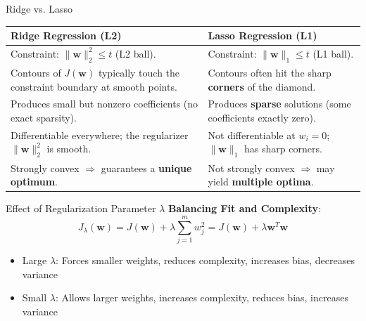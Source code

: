 \documentclass[serif, aspectratio=169]{beamer}
\begin{document}
\begin{frame}{Ridge vs. Lasso}
    \begin{table}[h!]
        \centering
        \renewcommand{\arraystretch}{1.4}
        \setlength{\tabcolsep}{8pt}
        \begin{tabular}{|p{}|p{}|}
            \hline
            \textbf{Ridge Regression (L2)} & \textbf{Lasso Regression (L1)} \\
            \hline
            Constraint: $\|\mathbf{w}\|_2^2 \le t$ (L2 ball). &
            Constraint: $\|\mathbf{w} \|_1 \le t$ (L1 ball). \\
            \hline
            Contours of $J(\mathbf{w})$ typically touch the constraint boundary at smooth points. &
            Contours often hit the sharp \textbf{corners} of the diamond. \\
            \hline
            Produces small but nonzero coefficients (no exact sparsity). &
            Produces \textbf{sparse} solutions (some coefficients exactly zero). \\
            \hline
            Differentiable everywhere; the regularizer $\|\mathbf{w}\|_2^2$ is smooth. &
            Not differentiable at $w_i = 0$; $\|\mathbf{w}\|_1$ has sharp corners. \\
            \hline
            Strongly convex $\Rightarrow$ guarantees a \textbf{unique optimum}. &
            Not strongly convex $\Rightarrow$ may yield \textbf{multiple optima}. \\
            \hline
        \end{tabular}
    \end{table}
\end{frame}



\begin{frame}{Effect of Regularization Parameter \( \lambda \)}
    \textbf{Balancing Fit and Complexity}:
    \[
    J_{\lambda}(\mathbf{w}) = J(\mathbf{w}) + \lambda \sum_{j=1}^{m} w_j^2 = J(\mathbf{w}) + \lambda \mathbf{w}^T\mathbf{w}
    \]
    \begin{itemize}
        \item Large \( \lambda \): Forces smaller weights, reduces complexity, increases bias, decreases variance
        \item Small \( \lambda \): Allows larger weights, increases complexity, reduces bias, increases variance
    \end{itemize}
\end{frame}
\end{document}

